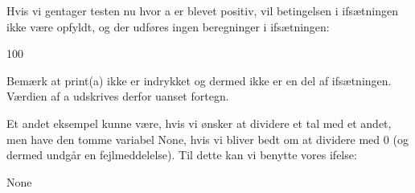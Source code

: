 \documentclass[letterpaper,10pt,english]{jupyterBook}
\begin{document}
Hvis vi gentager testen nu hvor a er blevet positiv, vil betingelsen i if\sphinxhyphen{}sætningen ikke være opfyldt, og der udføres ingen beregninger i if\sphinxhyphen{}sætningen:

\begin{sphinxVerbatim}[commandchars=\\\{\}]
    
         
\end{sphinxVerbatim}

\begin{sphinxVerbatim}[commandchars=\\\{\}]
100
\end{sphinxVerbatim}

Bemærk at print(a) ikke er indrykket og dermed ikke er en del af if\sphinxhyphen{}sætningen. Værdien af a udskrives derfor uanset fortegn.

Et andet eksempel kunne være, hvis vi ønsker at dividere et tal med et andet, men have den tomme variabel None, hvis vi bliver bedt om at dividere med 0 (og dermed undgår en fejlmeddelelse). Til dette kan vi benytte vores if\sphinxhyphen{}else:

\begin{sphinxVerbatim}[commandchars=\\\{\}]
  
  

    
        
 
         

\end{sphinxVerbatim}

\begin{sphinxVerbatim}[commandchars=\\\{\}]
None
\end{sphinxVerbatim}
\end{document}

